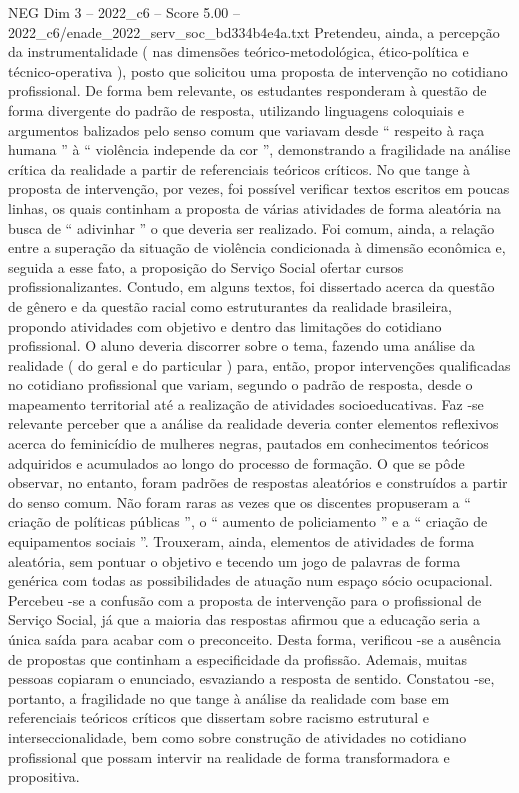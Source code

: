 \begin{textsample}{NEG Dim 3 – 2022\_c6 – Score 5.00 – 2022\_c6/enade\_2022\_serv\_soc\_bd334b4e4a.txt}
Pretendeu, ainda, a percepção da instrumentalidade ( nas dimensões teórico-metodológica, ético-política e técnico-operativa ), posto que solicitou uma proposta de intervenção no cotidiano profissional.
De forma bem relevante, os estudantes responderam à questão de forma divergente do padrão de resposta, utilizando linguagens coloquiais e argumentos balizados pelo senso comum que variavam desde “ respeito à raça humana ” à “ violência independe da cor ”, demonstrando a fragilidade na análise crítica da realidade a partir de referenciais teóricos críticos.
No que tange à proposta de intervenção, por vezes, foi possível verificar textos escritos em poucas linhas, os quais continham a proposta de várias atividades de forma aleatória na busca de “ adivinhar ” o que deveria ser realizado.
Foi comum, ainda, a relação entre a superação da situação de violência condicionada à dimensão econômica e, seguida a esse fato, a proposição do Serviço Social ofertar cursos profissionalizantes.
Contudo, em alguns textos, foi dissertado acerca da questão de gênero e da questão racial como estruturantes da realidade brasileira, propondo atividades com objetivo e dentro das limitações do cotidiano profissional.
O aluno deveria discorrer sobre o tema, fazendo uma análise da realidade ( do geral e do particular ) para, então, propor intervenções qualificadas no cotidiano profissional que variam, segundo o padrão de resposta, desde o mapeamento territorial até a realização de atividades socioeducativas.
Faz -se relevante perceber que a análise da realidade deveria conter elementos reflexivos acerca do feminicídio de mulheres negras, pautados em conhecimentos teóricos adquiridos e acumulados ao longo do processo de formação.
O que se pôde observar, no entanto, foram padrões de respostas aleatórios e construídos a partir do senso comum.
Não foram raras as vezes que os discentes propuseram a “ criação de políticas públicas ”, o “ aumento de policiamento ” e a “ criação de equipamentos sociais ”.
Trouxeram, ainda, elementos de atividades de forma aleatória, sem pontuar o objetivo e tecendo um jogo de palavras de forma genérica com todas as possibilidades de atuação num espaço sócio ocupacional.
Percebeu -se a confusão com a proposta de intervenção para o profissional de Serviço Social, já que a maioria das respostas afirmou que a educação seria a única saída para acabar com o preconceito.
Desta forma, verificou -se a ausência de propostas que continham a especificidade da profissão.
Ademais, muitas pessoas copiaram o enunciado, esvaziando a resposta de sentido.
Constatou -se, portanto, a fragilidade no que tange à análise da realidade com base em referenciais teóricos críticos que dissertam sobre racismo estrutural e interseccionalidade, bem como sobre construção de atividades no cotidiano profissional que possam intervir na realidade de forma transformadora e propositiva.

\end{textsample}
